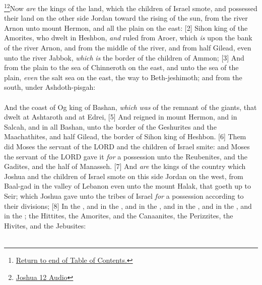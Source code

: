 \footnote{\textcolor[cmyk]{0.99998,1,0,0}{\hyperlink{TOC}{Return to end of Table of Contents.}}}\footnote{\href{https://audiobible.com/bible/joshua_12.html}{\textcolor[cmyk]{0.99998,1,0,0}{Joshua 12 Audio}}}\textcolor[cmyk]{0.99998,1,0,0}{Now  \emph{are} the kings of the land, which the children of Israel smote, and possessed their land on the other side Jordan toward the rising of the sun, from the river Arnon unto mount Hermon, and all the plain on the east:}
[2] \textcolor[cmyk]{0.99998,1,0,0}{Sihon king of the Amorites, who dwelt in Heshbon, \emph{and} ruled from Aroer, which \emph{is} upon the bank of the river Arnon, and from the middle of the river, and from half Gilead, even unto the river Jabbok, \emph{which} \emph{is} the border of the children of Ammon;}
[3] \textcolor[cmyk]{0.99998,1,0,0}{And from the plain to the sea of Chinneroth on the east, and unto the sea of the plain, \emph{even} the salt sea on the east, the way to Beth-jeshimoth; and from the south, under Ashdoth-pisgah:}\\
\\
\textcolor[cmyk]{0.99998,1,0,0}{And the coast of Og king of Bashan, \emph{which} \emph{was} of the remnant of the giants, that dwelt at Ashtaroth and at Edrei,}
[5] \textcolor[cmyk]{0.99998,1,0,0}{And reigned in mount Hermon, and in Salcah, and in all Bashan, unto the border of the Geshurites and the Maachathites, and half Gilead, the border of Sihon king of Heshbon.}
[6] \textcolor[cmyk]{0.99998,1,0,0}{Them did Moses the servant of the LORD and the children of Israel smite: and Moses the servant of the LORD gave it \emph{for} a possession unto the Reubenites, and the Gadites, and the half  of Manasseh.}
[7] \textcolor[cmyk]{0.99998,1,0,0}{And  \emph{are} the kings of the country which Joshua and the children of Israel smote on this side Jordan on the west, from Baal-gad in the valley of Lebanon even unto the mount Halak, that goeth up to Seir; which Joshua gave unto the tribes of Israel \emph{for} a possession according to their divisions;}
[8] \textcolor[cmyk]{0.99998,1,0,0}{In the , and in the , and in the , and in the , and in the , and in the ; the Hittites, the Amorites, and the Canaanites, the Perizzites, the Hivites, and the Jebusites:}\\
\\
